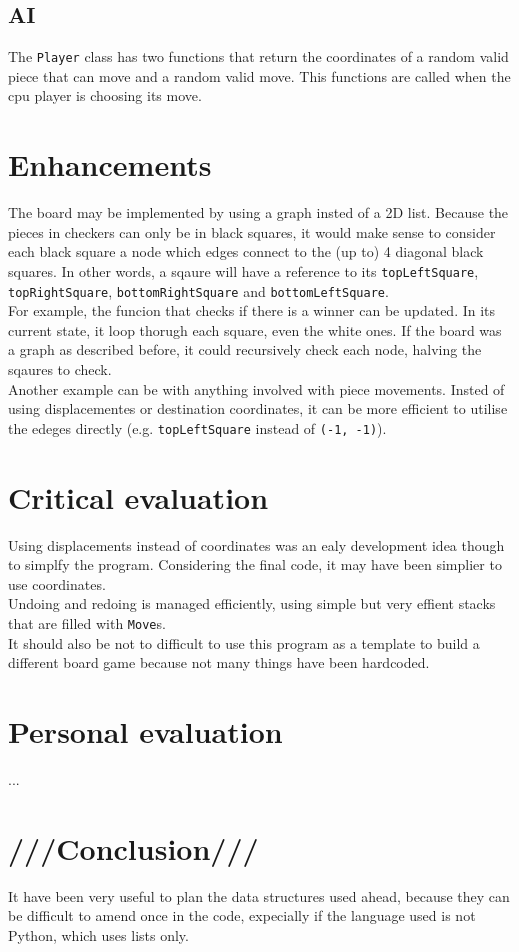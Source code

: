 \documentclass[10pt, a4paper]{article}
\begin{document}
	\subsection{AI}
	The \texttt{Player} class has two functions that return the coordinates of a random valid piece that can move and a random valid move. This functions are called when the cpu player is choosing its move.\\
	
	\section{Enhancements}
	The board may be implemented by using a graph insted of a 2D list. Because the pieces in checkers can only be in black squares, it would make sense to consider each black square a node which edges connect to the (up to) 4 diagonal black squares. In other words, a sqaure will have a reference to its \texttt{topLeftSquare}, \texttt{topRightSquare}, \texttt{bottomRightSquare} and \texttt{bottomLeftSquare}.\\
	For example, the funcion that checks if there is a winner can be updated. In its current state, it loop thorugh each square, even the white ones. If the board was a graph as described before, it could recursively check each node, halving the sqaures to check.\\
	Another example can be with anything involved with piece movements. Insted of using displacementes or destination coordinates, it can be more efficient to utilise the edeges directly (e.g. \texttt{topLeftSquare} instead of \texttt{(-1, -1)}).
	
	\section{Critical evaluation}
	Using displacements instead of coordinates was an ealy development idea though to simplfy the program. Considering the final code, it may have been simplier to use coordinates.\\
	Undoing and redoing is managed efficiently, using simple but very effient stacks that are filled with \texttt{Move}s.\\
	It should also be not to difficult to use this program as a template to build a different board game because not many things have been hardcoded.
	
	\section{Personal evaluation}
	...
	
	\section{///Conclusion///}
	It have been very useful to plan the data structures used ahead, because they can be difficult to amend once in the code, expecially if the language used is not Python, which uses lists only.
		
\end{document}
